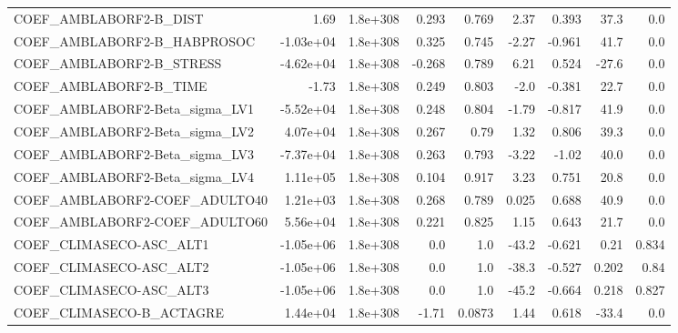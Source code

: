 \begin{tabular}{lrrrrrrrr}
COEF\_AMBLABORF2-B\_DIST            &        1.69 &     1.8e+308 &    0.293 &    0.769 &       2.37 &       0.393 &         37.3 &           0.0 \\
COEF\_AMBLABORF2-B\_HABPROSOC       &   -1.03e+04 &     1.8e+308 &    0.325 &    0.745 &      -2.27 &      -0.961 &         41.7 &           0.0 \\
COEF\_AMBLABORF2-B\_STRESS          &   -4.62e+04 &     1.8e+308 &   -0.268 &    0.789 &       6.21 &       0.524 &        -27.6 &           0.0 \\
COEF\_AMBLABORF2-B\_TIME            &       -1.73 &     1.8e+308 &    0.249 &    0.803 &       -2.0 &      -0.381 &         22.7 &           0.0 \\
COEF\_AMBLABORF2-Beta\_sigma\_LV1    &   -5.52e+04 &     1.8e+308 &    0.248 &    0.804 &      -1.79 &      -0.817 &         41.9 &           0.0 \\
COEF\_AMBLABORF2-Beta\_sigma\_LV2    &    4.07e+04 &     1.8e+308 &    0.267 &     0.79 &       1.32 &       0.806 &         39.3 &           0.0 \\
COEF\_AMBLABORF2-Beta\_sigma\_LV3    &   -7.37e+04 &     1.8e+308 &    0.263 &    0.793 &      -3.22 &       -1.02 &         40.0 &           0.0 \\
COEF\_AMBLABORF2-Beta\_sigma\_LV4    &    1.11e+05 &     1.8e+308 &    0.104 &    0.917 &       3.23 &       0.751 &         20.8 &           0.0 \\
COEF\_AMBLABORF2-COEF\_ADULTO40     &    1.21e+03 &     1.8e+308 &    0.268 &    0.789 &      0.025 &       0.688 &         40.9 &           0.0 \\
COEF\_AMBLABORF2-COEF\_ADULTO60     &    5.56e+04 &     1.8e+308 &    0.221 &    0.825 &       1.15 &       0.643 &         21.7 &           0.0 \\
COEF\_CLIMASECO-ASC\_ALT1           &   -1.05e+06 &     1.8e+308 &      0.0 &      1.0 &      -43.2 &      -0.621 &         0.21 &         0.834 \\
COEF\_CLIMASECO-ASC\_ALT2           &   -1.05e+06 &     1.8e+308 &      0.0 &      1.0 &      -38.3 &      -0.527 &        0.202 &          0.84 \\
COEF\_CLIMASECO-ASC\_ALT3           &   -1.05e+06 &     1.8e+308 &      0.0 &      1.0 &      -45.2 &      -0.664 &        0.218 &         0.827 \\
COEF\_CLIMASECO-B\_ACTAGRE          &    1.44e+04 &     1.8e+308 &    -1.71 &   0.0873 &       1.44 &       0.618 &        -33.4 &           0.0 \\

\end{tabular}
